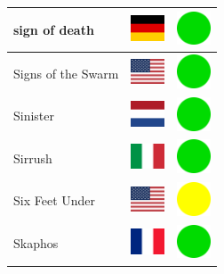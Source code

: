 \documentclass[12pt, a4paper, twoside]{report}
\begin{document}
\begin{center}
\begin{longtable}{|p{5cm}|p{2cm}|p{2cm}|}
 sign of death                                              & \includegraphics[width=1cm]{../4x3/de} &   \includegraphics[width=1cm]{../likes/y} \\ \hline
 Signs of the Swarm                                         & \includegraphics[width=1cm]{../4x3/us} &   \includegraphics[width=1cm]{../likes/y} \\ \hline
 Sinister                                                   & \includegraphics[width=1cm]{../4x3/nl} &   \includegraphics[width=1cm]{../likes/y} \\ \hline
 Sirrush                                                    & \includegraphics[width=1cm]{../4x3/it} &   \includegraphics[width=1cm]{../likes/y} \\ \hline
 Six Feet Under                                             & \includegraphics[width=1cm]{../4x3/us} &   \includegraphics[width=1cm]{../likes/m} \\ \hline
 Skaphos                                                    & \includegraphics[width=1cm]{../4x3/fr} &   \includegraphics[width=1cm]{../likes/y} \\ \hline

\end{longtable}
\end{center}
\end{document}
